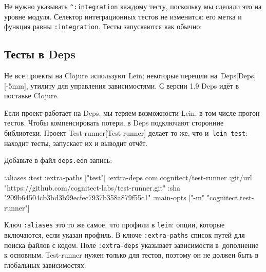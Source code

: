 Не нужно указывать \verb|^:integration| каждому тесту, поскольку мы сделали
это на уровне модуля. Селектор интеграционных тестов не изменится: его метка и
функция равны \verb|:integration|. Тесты запускаются как обычно:

\begin{english}
\end{english}

\subsection{Тесты в Deps}


Не все проекты на Clojure используют Lein; некоторые перешли
на~Deps[Deps][-5mm], утилиту для
управления зависимостями. С версии 1.9 Deps идёт в поставке Clojure.


Если проект работает на Deps, мы теряем возможности Lein, в том числе прогон
тестов. Чтобы компенсировать потери, в Deps подключают сторонние
библиотеки. Проект Test-runner[Test runner]
делает то же, что и~\verb|lein test|: находит тесты, запускает их и выводит
отчёт.

Добавьте в файл \verb|deps.edn| запись:

\begin{english}
  \begin{clojure}
:aliases
{:test
 {:extra-paths ["test"]
  :extra-deps
  {com.cognitect/test-runner
   {:git/url "https://github.com/cognitect-labs/test-runner.git"
    :sha "209b64504cb3bd3b99ecfec7937b358a879f55c1"}}
  :main-opts ["-m" "cognitect.test-runner"]}}
  \end{clojure}
\end{english}


Ключ \verb|:aliases| это то же самое, что профили в \verb|lein|: опции, которые
включаются, если указан профиль. В ключе \verb|:extra-paths| список путей для
поиска файлов с кодом. Поле \verb|:extra-deps| указывает зависимости
в~дополнение к основным. Test-runner нужен только для тестов, поэтому он не
должен быть в глобальных зависимостях.

